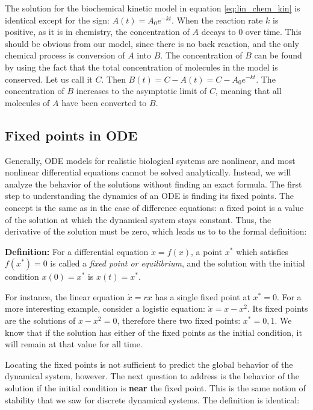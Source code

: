 \documentclass[11pt]{book}
\begin{document}
The solution for the biochemical kinetic model in equation \ref{eq:lin_chem_kin} is identical except for the sign: $ A(t) = A_0 e^{-kt}$. When the reaction rate $k$ is positive, as it is in chemistry, the concentration of $A$ decays to 0 over time. This should be obvious from our model, since there is no back reaction, and the only chemical process is conversion of $A$ into $B$.  The concentration of $B$ can be found by using the fact that the total concentration of molecules in the model is conserved. Let us call it $C$. Then $B(t) = C - A(t) = C- A_0e^{-kt}$. The concentration of $B$ increases to the asymptotic limit of $C$, meaning that all molecules of $A$ have been converted to $B$.

\subsection{Fixed points in ODE}
Generally, ODE models for realistic biological systems are nonlinear, and most nonlinear differential equations cannot be solved analytically. Instead, we will analyze the behavior of the solutions without finding an exact formula. The first step to understanding the dynamics of an ODE is finding its fixed points. The concept is the same as in the case of difference equations: a fixed point is a value of the solution at which the dynamical system stays constant. Thus, the derivative of the solution must be zero, which leads us to to the formal definition:

 \textbf{Definition:} For a differential equation $\dot x = f(x)$, a point $x^*$ which satisfies $f(x^*)=0$ is called a \emph{fixed point or equilibrium}, and the solution with the initial condition $x(0)=x^*$ is $x(t)=x^*$.

For instance, the linear equation $\dot x  = rx$ has a single fixed point at $x^* = 0$. For a more interesting example, consider a logistic equation: $\dot x = x - x^2 $. Its fixed points are the solutions of $x - x^2 = 0$, therefore there two fixed points: $x^* = 0, 1$. We know that if the solution has either of the fixed points as the initial condition, it will remain at that value for all time.

Locating the fixed points is not sufficient to predict the global behavior of the dynamical system, however. The next question to address is the behavior of the solution if the initial condition is \textbf{near} the fixed point. This is the same notion of stability that we saw for discrete dynamical systems. The definition is identical:
\end{document}
